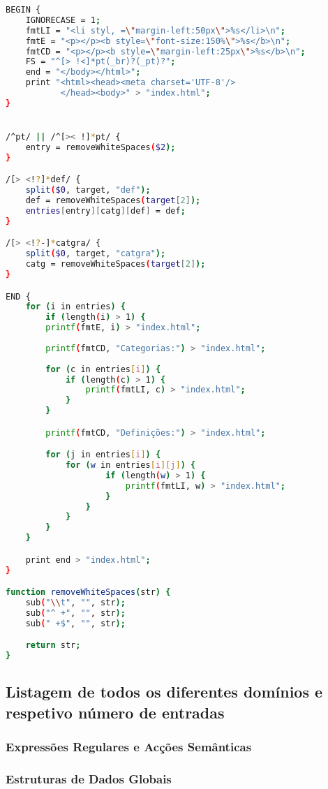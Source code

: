 \documentclass{article}
\begin{document}
\begin{lstlisting}[language=bash]
BEGIN {
	IGNORECASE = 1;
	fmtLI = "<li styl, =\"margin-left:50px\">%s</li>\n";
	fmtE = "<p></p><b style=\"font-size:150%\">%s</b>\n"; 
	fmtCD = "<p></p><b style=\"margin-left:25px\">%s</b>\n";
	FS = "^[> !<]*pt(_br)?(_pt)?";
	end = "</body></html>";
	print "<html><head><meta charset='UTF-8'/>
	       </head><body>" > "index.html";
}


/^pt/ || /^[>< !]*pt/ {
	entry = removeWhiteSpaces($2);
}

/[> <!?]*def/ {
	split($0, target, "def");
	def = removeWhiteSpaces(target[2]);
	entries[entry][catg][def] = def;
}

/[> <!?-]*catgra/ {
	split($0, target, "catgra");
	catg = removeWhiteSpaces(target[2]);
}

END {
	for (i in entries) {
		if (length(i) > 1) {
		printf(fmtE, i) > "index.html";
		
		printf(fmtCD, "Categorias:") > "index.html";
		
		for (c in entries[i]) {
			if (length(c) > 1) {
				printf(fmtLI, c) > "index.html";
			}
		}

		printf(fmtCD, "Definições:") > "index.html";

		for (j in entries[i]) {
			for (w in entries[i][j]) {
					if (length(w) > 1) {
						printf(fmtLI, w) > "index.html";
					}
				} 
			}
		}
	}

	print end > "index.html";
}

function removeWhiteSpaces(str) {
	sub("\\t", "", str);
	sub("^ +", "", str);
	sub(" +$", "", str);

	return str;
}

\end{lstlisting}

\subsection{Listagem de todos os diferentes domínios e respetivo número de entradas}

\subsubsection{Expressões Regulares e Acções Semânticas}

\subsubsection{Estruturas de Dados Globais}
\end{document}
